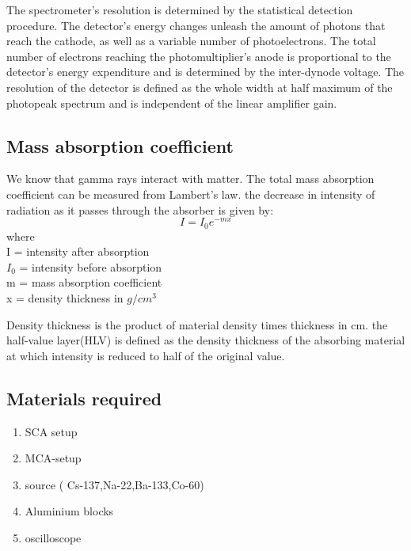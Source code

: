		The spectrometer's resolution is determined by the statistical detection procedure. The detector's energy changes unleash the amount of photons that reach the cathode, as well as a variable number of photoelectrons. The total number of electrons reaching the photomultiplier's anode is proportional to the detector's energy expenditure and is determined by the inter-dynode voltage. The resolution of the detector is defined as the whole width at half maximum of the photopeak spectrum and is independent of the linear amplifier gain.
	\subsection{Mass absorption coefficient}
		We know that gamma rays interact with matter. The total mass absorption coefficient can be measured from Lambert's law. the decrease in intensity of radiation as it passes through the absorber is given by:
		$$I=I_0e^{-mx}$$
		where \\
		I = intensity after absorption\\
		$I_0$ = intensity before absorption\\
		m = mass absorption coefficient\\
		x = density thickness in $g/cm^3$

		Density thickness is the product of material density times thickness in cm. the half-value layer(HLV) is defined as the density thickness of the absorbing material at which intensity is reduced to half of the original value.
		
	\subsection{Materials required}

		\begin{enumerate}
			\item SCA setup
			\item MCA-setup
			\item source ( Cs-137,Na-22,Ba-133,Co-60)
			\item Aluminium blocks
			\item oscilloscope
		\end{enumerate}